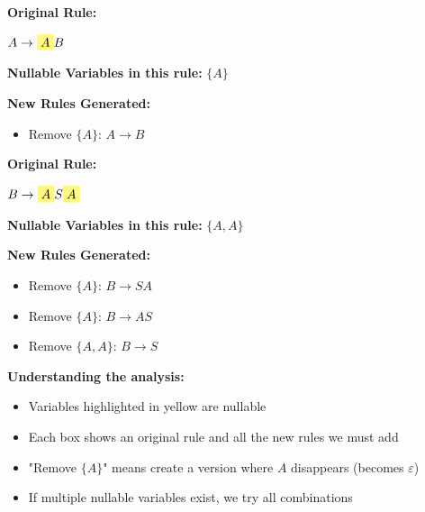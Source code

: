 \documentclass{article}
\begin{document}
\begin{tcolorbox}[colback=yellow!5!white,colframe=orange!75!black,title=Analysis of $A \to AB$]

\textbf{Original Rule:} 

$A \to \colorbox{yellow!50}{$A$}B$

\vspace{0.2cm}
\textbf{Nullable Variables in this rule:} $\{A\}$

\vspace{0.2cm}
\textbf{New Rules Generated:}
\begin{itemize}

    \item Remove $\{A\}$: \quad $A \to B$


\end{itemize}

\end{tcolorbox}

\begin{tcolorbox}[colback=yellow!5!white,colframe=orange!75!black,title=Analysis of $B \to ASA$]

\textbf{Original Rule:} 

$B \to \colorbox{yellow!50}{$A$}S\colorbox{yellow!50}{$A$}$

\vspace{0.2cm}
\textbf{Nullable Variables in this rule:} $\{A,A\}$

\vspace{0.2cm}
\textbf{New Rules Generated:}
\begin{itemize}

    \item Remove $\{A\}$: \quad $B \to SA$

    \item Remove $\{A\}$: \quad $B \to AS$

    \item Remove $\{A,A\}$: \quad $B \to S$


\end{itemize}

\end{tcolorbox}

\vspace{0.3cm}
\noindent\textbf{Understanding the analysis:}
\begin{itemize}
    \item \colorbox{yellow!50}{Variables highlighted in yellow} are nullable
    \item Each box shows an original rule and all the new rules we must add
    \item "Remove $\{A\}$" means create a version where $A$ disappears (becomes $\varepsilon$)
    \item If multiple nullable variables exist, we try all combinations
\end{itemize}
\end{document}
